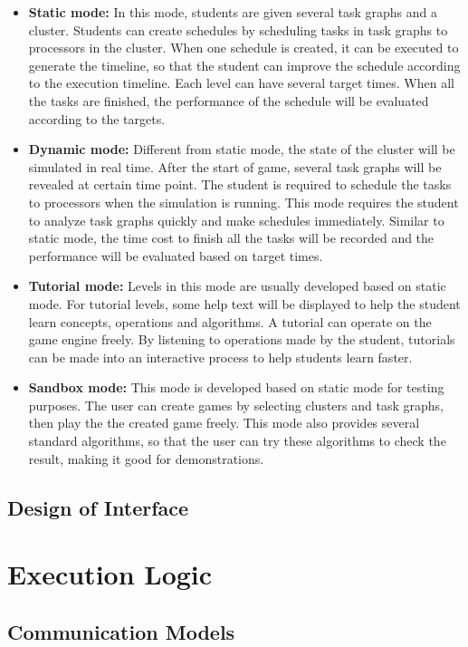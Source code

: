 \documentclass[msc,deptreport, cs]{infthesis}
\begin{document}
\begin{itemize}
  \item \textbf{Static mode:} In this mode, students are given several task graphs and a cluster. Students can create schedules by scheduling tasks in task graphs to processors in the cluster. When one schedule is created, it can be executed to generate the timeline, so that the student can improve the schedule according to the execution timeline. Each level can have several target times. When all the tasks are finished, the performance of the schedule will be evaluated according to the targets.
  \item \textbf{Dynamic mode:} Different from static mode, the state of the cluster will be simulated in real time. After the start of game, several task graphs will be revealed at certain time point. The student is required to schedule the tasks to processors when the simulation is running. This mode requires the student to analyze task graphs quickly and make schedules immediately. Similar to static mode, the time cost to finish all the tasks will be recorded and the performance will be evaluated based on target times.
  \item \textbf{Tutorial mode:} Levels in this mode are usually developed based on static mode. For tutorial levels, some help text will be displayed to help the student learn concepts, operations and algorithms. A tutorial can operate on the game engine freely. By listening to operations made by the student, tutorials can be made into an interactive process to help students learn faster.
  \item \textbf{Sandbox mode:} This mode is developed based on static mode for testing purposes. The user can create games by selecting clusters and task graphs, then play the the created game freely. This mode also provides several standard algorithms, so that the user can try these algorithms to check the result, making it good for demonstrations.
\end{itemize}

\subsection{Design of Interface}

\section{Execution Logic}

\subsection{Communication Models}
\end{document}
